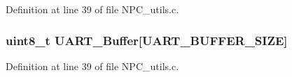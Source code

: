 Definition at line 39 of file N\+P\+C\+\_\+utils.\+c.

\subsubsection[{\texorpdfstring{U\+A\+R\+T\+\_\+\+Buffer}{UART_Buffer}}]{\setlength{\rightskip}{0pt plus 5cm}uint8\+\_\+t U\+A\+R\+T\+\_\+\+Buffer\mbox{[}{\bf U\+A\+R\+T\+\_\+\+B\+U\+F\+F\+E\+R\+\_\+\+S\+I\+ZE}\mbox{]}}\hypertarget{group___utils_gab42d904ed5954df151e40839a2351427}{}\label{group___utils_gab42d904ed5954df151e40839a2351427}


Definition at line 39 of file N\+P\+C\+\_\+utils.\+c.

